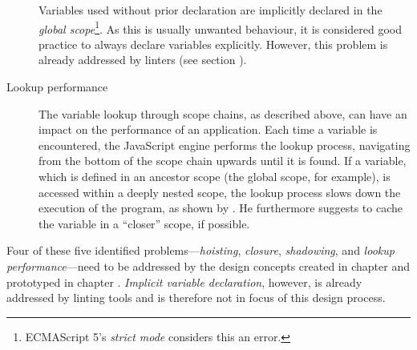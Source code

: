 \begin{description}
Variables used without prior declaration are implicitly declared in the
\emph{global
scope}\footnote{ECMAScript 5’s \emph{strict mode} considers this an error.}.
As this is usually unwanted behaviour, it is considered good practice to
always declare variables explicitly. However, this problem is already
addressed by linters (see section ).
\item[Lookup performance]
The variable lookup through scope chains, as described above, can have
an impact on the performance of an application. Each time a variable is
encountered, the JavaScript engine performs the lookup process,
navigating from the bottom of the scope chain upwards until it is found.
If a variable, which is defined in an ancestor scope (the global scope,
for example), is accessed within a deeply nested scope, the lookup
process slows down the execution of the program, as shown by
. He furthermore suggests to cache the variable in
a “closer” scope, if possible.
\end{description}

Four of these five identified problems—\emph{hoisting}, \emph{closure},
\emph{shadowing}, and \emph{lookup performance}—need to be addressed by
the design concepts created in chapter  and prototyped
in chapter . \emph{Implicit variable declaration},
however, is already addressed by linting tools and is therefore not in
focus of this design process.
